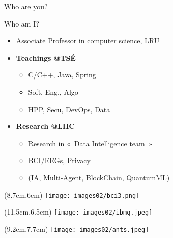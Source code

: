\documentclass[English,t,%
hyperref={%
    pdftitle={GM's Introduction},%
    pdfauthor={Guillaume Muller},%
    pdfsubject={GM's Introduction},%
    pdfkeywords={Presentation, Introduction}%
    },%
xcolor={pdftex,svgnames} %
]{beamer}
\begin{document}
\begin{frame}{Who are you?}

\end{frame}


\begin{frame}{Who am I?}

  \begin{itemize}
%
    \item Associate Professor in computer science, LRU
%
    \vspace{2em}
    \item \textbf{Teachings @TSÉ}
    \vspace{.5em}
    \begin{itemize}
      \item C/C++, Java, Spring
      \item Soft. Eng., Algo
      \item HPP, Secu, DevOps, Data
    \end{itemize}
%
    \vspace{2em}
    \item \textbf{Research @LHC}
    \vspace{.5em}
    \begin{itemize}
      \item Research in «~Data Intelligence team~»
      \item BCI/EEGs, Privacy
      \item (IA, Multi-Agent, BlockChain, QuantumML)
    \end{itemize}
%
  \end{itemize}

\begin{textblock*}{2cm}(8.7cm,6cm)%
  \texttt{[image: images02/bci3.png]}
\end{textblock*}%

\begin{textblock*}{2cm}(11.5cm,6.5cm)%
  \texttt{[image: images02/ibmq.jpeg]}
\end{textblock*}%

\begin{textblock*}{2cm}(9.2cm,7.7cm)%
  \texttt{[image: images02/ants.jpeg]}
\end{textblock*}%

\end{frame}
\end{document}
